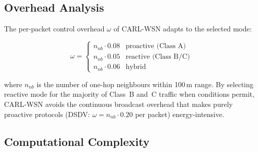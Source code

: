 \documentclass[12pt]{article}
\begin{document}
\subsection{Overhead Analysis}

The per-packet control overhead $\omega$ of CARL-WSN adapts to the
selected mode:

\begin{equation}
\omega = \begin{cases}
n_{nb} \cdot 0.08 & \text{proactive (Class~A)} \\
n_{nb} \cdot 0.05 & \text{reactive (Class~B/C)} \\
n_{nb} \cdot 0.06 & \text{hybrid}
\end{cases}
\label{eq:overhead_modes}
\end{equation}

where $n_{nb}$ is the number of one-hop neighbours within 100\,m
range. By selecting reactive mode for the majority of Class~B and~C
traffic when conditions permit, CARL-WSN avoids the continuous
broadcast overhead that makes purely proactive protocols
(DSDV: $\omega = n_{nb} \cdot 0.20$ per packet) energy-intensive.

\subsection{Computational Complexity}
\label{sec:complexity}
\end{document}
